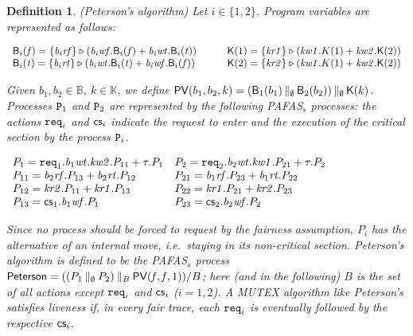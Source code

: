 \documentclass[copyright,creativecommons]{eptcs}
\newtheorem{definition}[theorem]{Definition}
\newcommand{\rop}{\triangleright}
\newcommand{\bool}{{\mathbb B}}
\newcommand{\kvalues}{{\mathbb K}}
\newcommand{\fa}{\mathit{f}}
\newcommand{\tr}{\mathit{t}}
\newcommand{\Bv}{{\sf B}}
\newcommand{\rtb}[1]{{\it b_{{\rm #1}}rt}}
\newcommand{\rfb}[1]{{\it b_{{\rm #1}}rf}}
\newcommand{\wtb}[1]{{\it b_{{\rm #1}}wt}}
\newcommand{\wfb}[1]{{\it b_{{\rm #1}}wf}}
\newcommand{\Kv}{{\sf K}}
\newcommand{\rk}[1]{{\it kr #1}}
\newcommand{\wk}[1]{{\it kw #1}}
\newcommand{\ruk}{\rk{1}}
\newcommand{\rdk}{\rk{2}}
\newcommand{\wuk}{\wk{1}}
\newcommand{\wdk}{\wk{2}}
\newcommand{\vp}{{\sf PV}}
\newcommand{\req}{{\tt req}}
\newcommand{\cs}{{\sf cs}}
\newcommand{\petersona}{{\sf Peterson}} \newcommand{\petersonb}{\petersona}
\newcommand{\proc}{{\tt P}}
\begin{document}
\begin{definition}\label{pet-algo1}\rm({\sl Peterson's algorithm})
Let $i\in\{1,2\}$. Program variables are represented as follows:

\hspace{0.5cm}
$
\begin{array}{l l}
\Bv_i(\fa) = \{\rfb{\it i}\} \rop (\wfb{{\it i}}.\Bv_i(\fa) + \wtb{\it
i}.\Bv_i(\tr)) \qquad &
\Kv(1) =  \{\ruk\} \rop (\wuk.K(1) + \wdk .\Kv(2))\\
\Bv_i(\tr) = \{\rtb{\it i}\} \rop (\wtb{{\it i}}.\Bv_i(\tr) + \wfb{\it
i}. \Bv_i(\fa)) &
\Kv(2) =  \{\rdk\}\rop (\wuk.K(1) + \wdk .\Kv(2))
\end{array}
$

\vspace{0.1cm}

\noindent
Given $b_1, b_2 \in \bool$, $k\in\kvalues$, we define $\vp(b_1, b_2, k)
= (\Bv_1(b_1) \,\|_{\emptyset}\, \Bv_2(b_2)) \,\|_{\emptyset}\, \Kv(k)$.
Processes $\proc_1$ and $\proc_2$ are represented by the following
PAFAS$_s$ processes: the actions $\req_i$ and $\cs_i$ indicate the request
to enter and the execution of the critical section by the process
$\proc_i$.

\hspace{3cm}
$\begin{array}{ll}
P_1 = \req_1.\wtb{1}.\wk{2}.P_{11} + \tau.P_{1} & 
P_2 = \req_2.\wtb{2}.\wk{1}.P_{21} + \tau.P_{2} \\
P_{11} = \rfb{2}.P_{13} + \rtb{2}.P_{12} &
P_{21} = \rfb{1}.P_{23} + \rtb{1}.P_{22}\\
P_{12} = \rk{2}.P_{11} + \rk{1}.P_{13} & 
P_{22} = \rk{1}.P_{21} + \rk{2}.P_{23}\\
P_{13} = \cs_1.\wfb{1}.P_{1} & 
P_{23} = \cs_2.\wfb{2}.P_{2}
\end{array}$

\noindent
Since no process should be forced to request by the fairness assumption,
$P_i$ has the alternative of an internal move, i.e.\ staying in its
non-critical section.
Peterson's algorithm is defined to be the PAFAS$_s$ process $\petersona
= ((P_1 \:\|_{\emptyset}\: P_2) \:\|_B\: \vp(\fa, \fa, 1))/B$; here (and in
the following) $B$ is the set of all actions except $\req_i$ and $\cs_i$
($i=1,2$). A MUTEX algorithm like Peterson's satisfies {\em liveness} if,
in every fair trace, each $\req_i$ is eventually followed by the respective
$\cs_i$.
\end{definition}
\end{document}
